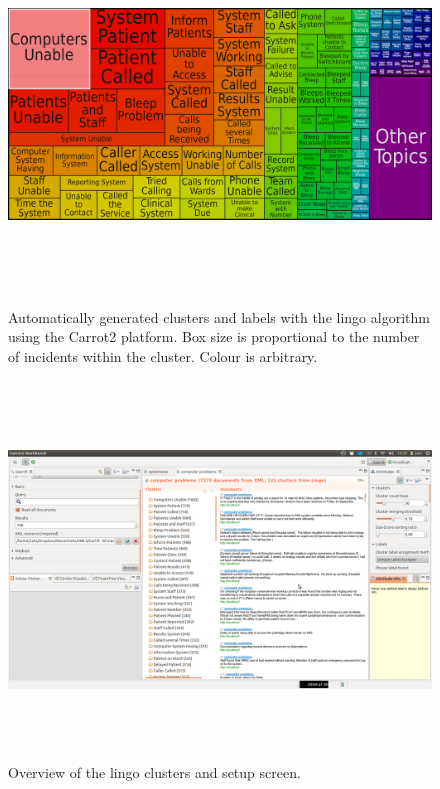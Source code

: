 \begin{figure}[htp]
\centering
\includegraphics[width=15cm,height=10cm]{figs/lingoclustering.png}
\caption{Automatically generated clusters and labels with the lingo algorithm using the Carrot2 platform. Box size is proportional to the number of incidents within the cluster. Colour is arbitrary.}\label{fig:lingoclustering}
\end{figure}

\begin{figure}[htp]
\centering
\includegraphics[width=15cm,height=10cm]{figs/clustering2.png}
\caption{Overview of the lingo clusters and setup screen.}\label{fig:lingoclustering2}
\end{figure}

